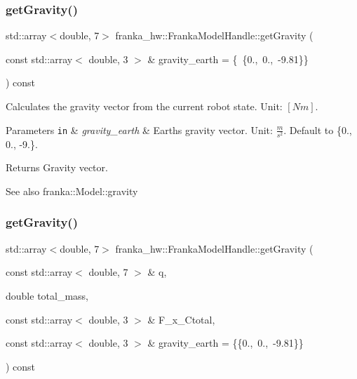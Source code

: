 \subsubsection{\texorpdfstring{get\+Gravity()}{getGravity()}\hspace{0.1cm}{\footnotesize\ttfamily [1/2]}}
{\footnotesize\ttfamily std\+::array$<$double, 7$>$ franka\+\_\+hw\+::\+Franka\+Model\+Handle\+::get\+Gravity (\begin{DoxyParamCaption}\item[{const std\+::array$<$ double, 3 $>$ \&}]{gravity\+\_\+earth = {\ttfamily \{~\{0.,~0.,~-\/9.81\}\}} }\end{DoxyParamCaption}) const\hspace{0.3cm}{\ttfamily [inline]}}

Calculates the gravity vector from the current robot state. Unit\+: $[Nm]$.


\begin{DoxyParams}[1]{Parameters}
\mbox{\tt in}  & {\em gravity\+\_\+earth} & Earth\textquotesingle{}s gravity vector. Unit\+: $\frac{m}{s^2}$. Default to \{0., 0., -\/9.\}.\\
\hline
\end{DoxyParams}
\begin{DoxyReturn}{Returns}
Gravity vector.
\end{DoxyReturn}
\begin{DoxySeeAlso}{See also}
franka\+::\+Model\+::gravity 
\end{DoxySeeAlso}
\mbox{\label{classfranka__hw_1_1_franka_model_handle_a832505472a8e7bc9e12f26a57eb659f8}} 
\subsubsection{\texorpdfstring{get\+Gravity()}{getGravity()}\hspace{0.1cm}{\footnotesize\ttfamily [2/2]}}
{\footnotesize\ttfamily std\+::array$<$double, 7$>$ franka\+\_\+hw\+::\+Franka\+Model\+Handle\+::get\+Gravity (\begin{DoxyParamCaption}\item[{const std\+::array$<$ double, 7 $>$ \&}]{q,  }\item[{double}]{total\+\_\+mass,  }\item[{const std\+::array$<$ double, 3 $>$ \&}]{F\+\_\+x\+\_\+\+Ctotal,  }\item[{const std\+::array$<$ double, 3 $>$ \&}]{gravity\+\_\+earth = {\ttfamily \{\{0.,~0.,~-\/9.81\}\}} }\end{DoxyParamCaption}) const\hspace{0.3cm}{\ttfamily [inline]}}

